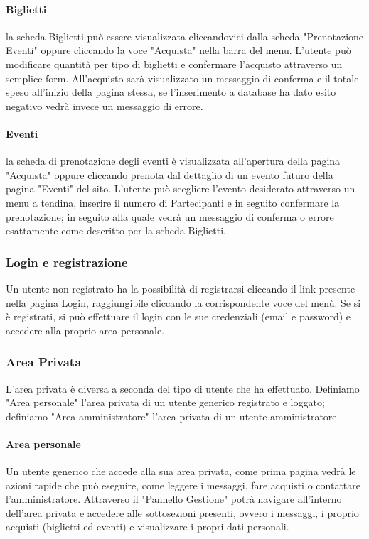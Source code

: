             \paragraph{Biglietti}la scheda Biglietti può essere visualizzata cliccandovici dalla scheda "Prenotazione Eventi" oppure cliccando la voce "Acquista" nella barra del menu. L'utente può modificare quantità per tipo di biglietti e confermare l'acquisto attraverso un semplice form. All'acquisto sarà visualizzato un messaggio di conferma e il totale speso all'inizio della pagina stessa, se l'inserimento a database ha dato esito negativo vedrà invece un messaggio di errore.
            \paragraph{Eventi}la scheda di prenotazione degli eventi è visualizzata all'apertura della pagina "Acquista" oppure cliccando prenota dal dettaglio di un evento futuro della pagina "Eventi" del sito. L'utente può scegliere l'evento desiderato attraverso un menu a tendina, inserire il numero di Partecipanti e in seguito confermare la prenotazione; in seguito alla quale vedrà un messaggio di conferma o errore esattamente come descritto per la scheda Biglietti.
        \subsubsection{Login e registrazione}
            Un utente non registrato ha la possibilità di registrarsi cliccando il link presente nella pagina Login, raggiungibile cliccando la corrispondente voce del menù. Se si è registrati, si può effettuare il login con le sue credenziali (email e password) e accedere alla proprio area personale.
        \subsubsection{Area Privata}
            L'area privata è diversa a seconda del tipo di utente che ha effettuato. Definiamo "Area personale" l'area privata di un utente generico registrato e loggato; definiamo "Area amministratore" l'area privata di un utente amministratore.
            \paragraph{Area personale} Un utente generico che accede alla sua area privata, come prima pagina vedrà le azioni rapide che può eseguire, come leggere i messaggi, fare acquisti o contattare l'amministratore. Attraverso il "Pannello Gestione" potrà navigare all'interno dell'area privata e accedere alle sottosezioni presenti, ovvero i messaggi, i proprio acquisti (biglietti ed eventi) e visualizzare i propri dati personali.
